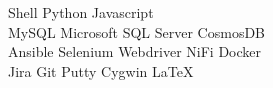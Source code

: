 \documentclass[]{deedy-resume-openfont}
\begin{document}
\begin{minipage}[t]{0.33\textwidth}
 Shell \textbullet{} Python \textbullet{} Javascript \\

MySQL \textbullet{} Microsoft SQL Server \textbullet{} CosmosDB \\

Ansible \textbullet{} Selenium \textbullet{} Webdriver \textbullet{} NiFi \textbullet{} Docker \\

Jira \textbullet{} Git \textbullet{} Putty \textbullet{} Cygwin \textbullet{} \LaTeX\
\sectionsep



%
%

\end{minipage} 
\hfill
\end{document}
